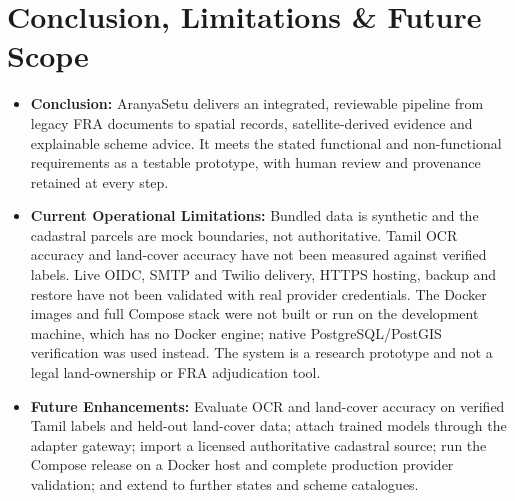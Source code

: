 \documentclass[11pt, a4paper]{article}
\begin{document}
\section{Conclusion, Limitations \& Future Scope}
\begin{itemize}[noitemsep, topsep=2pt]
    \item \textbf{Conclusion:} AranyaSetu delivers an integrated, reviewable pipeline from legacy FRA documents to spatial records, satellite-derived evidence and explainable scheme advice. It meets the stated functional and non-functional requirements as a testable prototype, with human review and provenance retained at every step.
    \item \textbf{Current Operational Limitations:} Bundled data is synthetic and the cadastral parcels are mock boundaries, not authoritative. Tamil OCR accuracy and land-cover accuracy have not been measured against verified labels. Live OIDC, SMTP and Twilio delivery, HTTPS hosting, backup and restore have not been validated with real provider credentials. The Docker images and full Compose stack were not built or run on the development machine, which has no Docker engine; native PostgreSQL/PostGIS verification was used instead. The system is a research prototype and not a legal land-ownership or FRA adjudication tool.
    \item \textbf{Future Enhancements:} Evaluate OCR and land-cover accuracy on verified Tamil labels and held-out land-cover data; attach trained models through the adapter gateway; import a licensed authoritative cadastral source; run the Compose release on a Docker host and complete production provider validation; and extend to further states and scheme catalogues.
\end{itemize}

\end{document}
